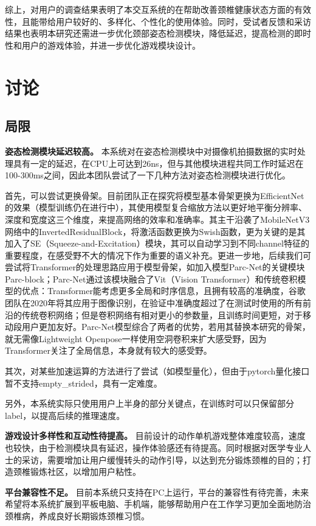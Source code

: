 \documentclass[12pt,a4paper]{article}%
\begin{document}
综上，对用户的调查结果表明了本交互系统的在帮助改善颈椎健康状态方面的有效性，且能带给用户较好的、多样化、个性化的使用体验。同时，受试者反馈和采访结果也表明本研究还需进一步优化颈部姿态检测模块，降低延迟，提高检测的即时性和用户的游戏体验，并进一步优化游戏模块设计。

\section{讨论}
\subsection{局限}
\textbf{姿态检测模块延迟较高。}
本系统对在姿态检测模块中对摄像机拍摄数据的实时处理具有一定的延迟，在CPU上可达到26ns，但与其他模块进程共同工作时延迟在100-300ms之间，因此本团队尝试了一下几种方法对姿态检测模块进行优化。


首先，可以尝试更换骨架。目前团队正在探究将模型基本骨架更换为EfficientNet\cite{tan2019efficientnet}的效果（模型训练仍在进行中），其使用模型复合缩放方法以更好地平衡分辨率、深度和宽度这三个维度，来提高网络的效率和准确率。其主干沿袭了MobileNetV3网络中的InvertedResidualBlock，将激活函数更换为Swish函数，更为关键的是其加入了SE（Squeeze-and-Excitation）模块，其可以自动学习到不同channel特征的重要程度，在感受野不大的情况下作为重要的语义补充。更进一步地，后续我们可尝试将Transformer的处理思路应用于模型骨架，如加入模型Parc-Net的关键模块Parc-block\cite{zhang2022parc}；Parc-Net通过该模块融合了Vit（Vision Transformer）和传统卷积模型的优点：Transformer能考虑更多全局和时序信息，且拥有较高的准确度，谷歌团队在2020年将其应用于图像识别，在验证中准确度超过了在测试时使用的所有前沿的传统卷积网络\cite{vit}；但是卷积网络有相对更小的参数量，且训练时间更短，对于移动段用户更加友好。Parc-Net模型综合了两者的优势，若用其替换本研究的骨架，就无需像Lightweight Openpose一样使用空洞卷积来扩大感受野，因为Transformer关注了全局信息，本身就有较大的感受野。


其次，对某些加速运算的方法进行了尝试（如模型量化），但由于pytorch量化接口暂不支持empty\_strided，具有一定难度。


另外，本系统实际只使用用户上半身的部分关键点，在训练时可以只保留部分label，以提高后续的推理速度。


\textbf{游戏设计多样性和互动性待提高。}
目前设计的动作单机游戏整体难度较高，速度也较快，由于检测模块具有延迟，操作体验感还有待提高。同时根据对医学专业人士的采访，需要增加让用户缓慢转头的动作引导，以达到充分锻炼颈椎的目的；打造颈椎锻炼社区，以增加用户粘性。

\textbf{平台兼容性不足。}
目前本系统只支持在PC上运行，平台的兼容性有待完善，未来希望将本系统扩展到平板电脑、手机端，能够帮助用户在工作学习更加全面地防治颈椎病，养成良好长期锻炼颈椎习惯。
\end{document}
